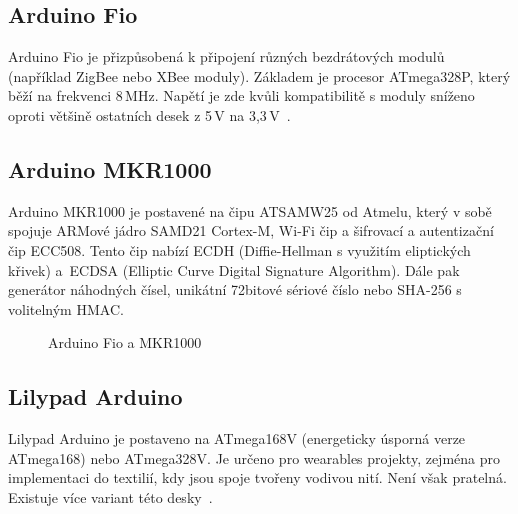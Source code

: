 		
		\subsection{Arduino Fio} 
		Arduino Fio je přizpůsobená k připojení různých bezdrátových modulů (například ZigBee nebo XBee moduly). Základem je procesor ATmega328P, který běží na frekvenci 8\,MHz. Napětí je zde kvůli kompatibilitě s moduly sníženo oproti většině ostatních desek z 5\,V na 3,3\,V~\cite{ArduinoFio}.	
		
	\subsection{Arduino MKR1000}
	Arduino MKR1000 je postavené na čipu ATSAMW25 od Atmelu, který v sobě spojuje ARMové jádro SAMD21 Cortex-M, Wi-Fi čip a šifrovací a autentizační čip ECC508. Tento čip nabízí ECDH (Diffie-Hellman s využitím eliptických křivek) a~ECDSA (Elliptic Curve Digital Signature Algorithm). Dále pak generátor náhodných čísel, unikátní 72bitové sériové číslo nebo SHA-256 s volitelným HMAC.
	
	
	\begin{figure}[!ht]
    \centering
			\hspace*{5mm}
		\caption{Arduino Fio a MKR1000}
		\vspace{-30pt}	
\end{figure}
	
		\subsection{Lilypad Arduino} 
		Lilypad Arduino je postaveno na ATmega168V (energeticky úsporná verze ATmega168) nebo ATmega328V. Je určeno pro wearables projekty, zejména pro implementaci do textilií, kdy jsou spoje tvořeny vodivou nití. Není však pratelná. Existuje více variant této desky~\cite{ArduinoLilipad}.	
	
